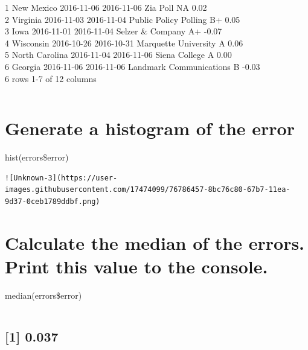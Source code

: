 \documentclass[
]{article}
\begin{document}
1 New Mexico 2016-11-06 2016-11-06 Zia Poll NA 0.02\\
2 Virginia 2016-11-03 2016-11-04 Public Policy Polling B+ 0.05\\
3 Iowa 2016-11-01 2016-11-04 Selzer \& Company A+ -0.07\\
4 Wisconsin 2016-10-26 2016-10-31 Marquette University A 0.06\\
5 North Carolina 2016-11-04 2016-11-06 Siena College A 0.00\\
6 Georgia 2016-11-06 2016-11-06 Landmark Communications B -0.03\\
6 rows \textbar{} 1-7 of 12 columns

\begin{verbatim}
\end{verbatim}

\hypertarget{generate-a-histogram-of-the-error}{%
\section{Generate a histogram of the
error}\label{generate-a-histogram-of-the-error}}

hist(errors\$error)

\begin{verbatim}
![Unknown-3](https://user-images.githubusercontent.com/17474099/76786457-8bc76c80-67b7-11ea-9d37-0ceb1789ddbf.png)
\end{verbatim}

\hypertarget{calculate-the-median-of-the-errors.-print-this-value-to-the-console.}{%
\section{Calculate the median of the errors. Print this value to the
console.}\label{calculate-the-median-of-the-errors.-print-this-value-to-the-console.}}

median(errors\$error)

\begin{verbatim}
\end{verbatim}

\hypertarget{section}{%
\subsection{{[}1{]} 0.037}\label{section}}
\end{document}
